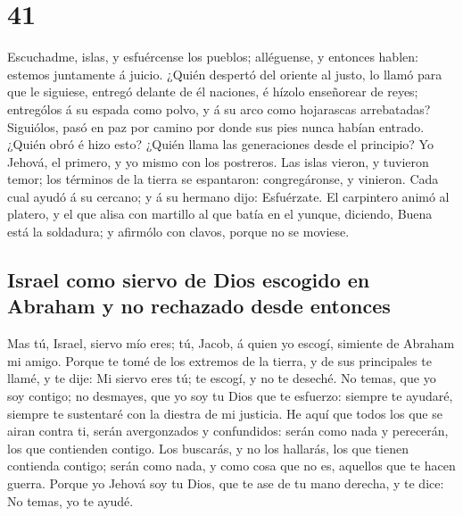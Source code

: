 \hypertarget{section-23-41}{%
\section{41}\label{section-23-41}}

 Escuchadme, islas, y esfuércense los pueblos; alléguense,
y entonces hablen: estemos juntamente á juicio.  ¿Quién
despertó del oriente al justo, lo llamó para que le siguiese, entregó
delante de él naciones, é hízolo enseñorear de reyes; entrególos á su
espada como polvo, y á su arco como hojarascas arrebatadas?
 Siguiólos, pasó en paz por camino por donde sus pies
nunca habían entrado.  ¿Quién obró é hizo esto? ¿Quién
llama las generaciones desde el principio? Yo Jehová, el primero, y yo
mismo con los postreros.  Las islas vieron, y tuvieron
temor; los términos de la tierra se espantaron: congregáronse, y
vinieron.  Cada cual ayudó á su cercano; y á su hermano
dijo: Esfuérzate.  El carpintero animó al platero, y el
que alisa con martillo al que batía en el yunque, diciendo, Buena está
la soldadura; y afirmólo con clavos, porque no se moviese.

\hypertarget{israel-como-siervo-de-dios-escogido-en-abraham-y-no-rechazado-desde-entonces}{%
\subsection{Israel como siervo de Dios escogido en Abraham y no
rechazado desde
entonces}\label{israel-como-siervo-de-dios-escogido-en-abraham-y-no-rechazado-desde-entonces}}

 Mas tú, Israel, siervo mío eres; tú, Jacob, á quien yo
escogí, simiente de Abraham mi amigo.  Porque te tomé de
los extremos de la tierra, y de sus principales te llamé, y te dije: Mi
siervo eres tú; te escogí, y no te deseché.  No temas,
que yo soy contigo; no desmayes, que yo soy tu Dios que te esfuerzo:
siempre te ayudaré, siempre te sustentaré con la diestra de mi justicia.
 He aquí que todos los que se airan contra ti, serán
avergonzados y confundidos: serán como nada y perecerán, los que
contienden contigo.  Los buscarás, y no los hallarás, los
que tienen contienda contigo; serán como nada, y como cosa que no es,
aquellos que te hacen guerra.  Porque yo Jehová soy tu
Dios, que te ase de tu mano derecha, y te dice: No temas, yo te ayudé.


